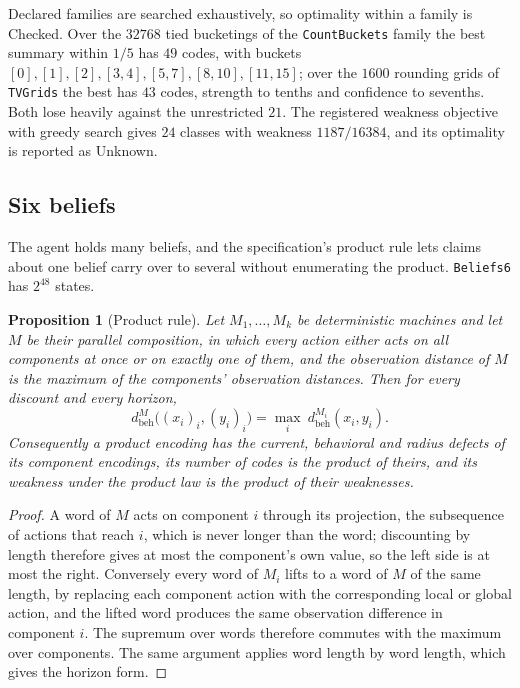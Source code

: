\documentclass[11pt]{article}
\newcommand{\code}[1]{\texttt{#1}}
\newcommand{\dbeh}{d_{\mathrm{beh}}}
\theoremstyle{definition}
\theoremstyle{plain}
\newtheorem{proposition}[definition]{Proposition}
\begin{document}
Declared families are searched exhaustively, so optimality within a family is Checked. Over the
$32768$ tied bucketings of the \code{CountBuckets} family the best summary within $1/5$ has $49$
codes, with buckets $[0],[1],[2],[3,4],[5,7],[8,10],[11,15]$; over the $1600$ rounding grids of
\code{TVGrids} the best has $43$ codes, strength to tenths and confidence to sevenths. Both lose
heavily against the unrestricted $21$. The registered weakness objective with greedy search gives
$24$ classes with weakness $1187/16384$, and its optimality is reported as Unknown.

\subsection{Six beliefs}

The agent holds many beliefs, and the specification's product rule lets claims about one belief
carry over to several without enumerating the product. \code{Beliefs6} has $2^{48}$ states.

\begin{proposition}[Product rule]\label{prop:product}
Let $M_1,\dots,M_k$ be deterministic machines and let $M$ be their parallel composition, in which
every action either acts on all components at once or on exactly one of them, and the observation
distance of $M$ is the maximum of the components' observation distances. Then for every discount
and every horizon,
\[
\dbeh^M\bigl((x_i)_i,(y_i)_i\bigr)=\max_i\ \dbeh^{M_i}(x_i,y_i).
\]
Consequently a product encoding has the current, behavioral and radius defects of its component
encodings, its number of codes is the product of theirs, and its weakness under the product law is
the product of their weaknesses.
\end{proposition}

\begin{proof}
A word of $M$ acts on component $i$ through its projection, the subsequence of actions that reach
$i$, which is never longer than the word; discounting by length therefore gives at most the
component's own value, so the left side is at most the right. Conversely every word of $M_i$ lifts
to a word of $M$ of the same length, by replacing each component action with the corresponding
local or global action, and the lifted word produces the same observation difference in component
$i$. The supremum over words therefore commutes with the maximum over components. The same argument
applies word length by word length, which gives the horizon form.
\end{proof}
\end{document}
